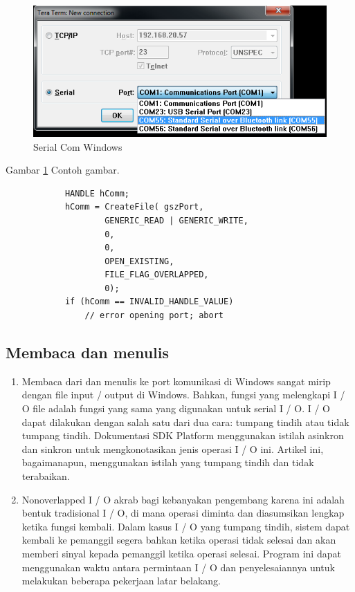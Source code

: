 	\begin{figure}[ht]
		\centerline{\includegraphics[width=1\textwidth]{figures/seria.png}}
		\caption{Serial Com Windows}
		\label{seria}
	\end{figure}
	Gambar \ref{seria} Contoh gambar.
		
		\begin{verbatim}
			HANDLE hComm;
			hComm = CreateFile( gszPort,  
                    GENERIC_READ | GENERIC_WRITE, 
                    0, 
                    0, 
                    OPEN_EXISTING,
                    FILE_FLAG_OVERLAPPED,
                    0);
			if (hComm == INVALID_HANDLE_VALUE)
				// error opening port; abort
		\end{verbatim}
	\subsection{Membaca dan menulis}
		\begin{enumerate}
			\item Membaca dari dan menulis ke port komunikasi di Windows sangat mirip dengan file input / output  di Windows. Bahkan, fungsi yang melengkapi I / O file adalah fungsi yang sama yang digunakan untuk serial I / O. I / O dapat dilakukan dengan salah satu dari dua cara: tumpang tindih atau tidak tumpang tindih. Dokumentasi SDK Platform menggunakan istilah asinkron dan sinkron untuk mengkonotasikan jenis operasi I / O ini. Artikel ini, bagaimanapun, menggunakan istilah yang tumpang tindih dan tidak terabaikan.
			\item Nonoverlapped I / O akrab bagi kebanyakan pengembang karena ini adalah bentuk tradisional I / O, di mana operasi diminta dan diasumsikan lengkap ketika fungsi kembali. Dalam kasus I / O yang tumpang tindih, sistem dapat kembali ke pemanggil segera bahkan ketika operasi tidak selesai dan akan memberi sinyal kepada pemanggil ketika operasi selesai. Program ini dapat menggunakan waktu antara permintaan I / O dan penyelesaiannya untuk melakukan beberapa pekerjaan latar belakang.
		\end{enumerate}
